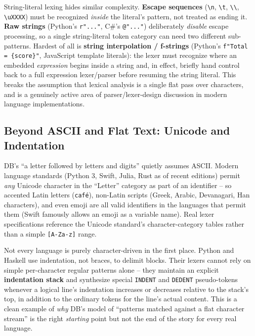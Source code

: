 \documentclass[full-course-notes.tex]{subfiles}
\begin{document}
String-literal lexing hides similar complexity. \textbf{Escape sequences}
(\texttt{\textbackslash n}, \texttt{\textbackslash t}, \texttt{\textbackslash\textbackslash},
\texttt{\textbackslash uXXXX}) must be recognized \emph{inside} the literal's pattern, not
treated as ending it. \textbf{Raw strings} (Python's \texttt{r"..."}, C\#'s \texttt{@"..."})
deliberately \emph{disable} escape processing, so a single string-literal token category can
need two different sub-patterns. Hardest of all is \textbf{string interpolation / f-strings}
(Python's \texttt{f"Total = \{score\}"}, JavaScript template literals): the lexer must recognize
where an embedded \emph{expression} begins inside a string and, in effect, briefly hand control
back to a full expression lexer/parser before resuming the string literal. This breaks the
assumption that lexical analysis is a single flat pass over characters, and is a genuinely
active area of parser/lexer-design discussion in modern language implementations.

\subsection{Beyond ASCII and Flat Text: Unicode and Indentation}

DB's ``a letter followed by letters and digits'' quietly assumes ASCII. Modern language
standards (Python 3, Swift, Julia, Rust as of recent editions) permit \emph{any} Unicode
character in the ``Letter'' category as part of an identifier -- so accented Latin letters
(\texttt{caf\'e}), non-Latin scripts (Greek, Arabic, Devanagari, Han characters), and even emoji
are all valid identifiers in the languages that permit them (Swift famously allows an emoji as a
variable name). Real lexer specifications reference the Unicode standard's character-category
tables rather than a simple \texttt{[A-Za-z]} range.

Not every language is purely character-driven in the first place. Python and Haskell use
indentation, not braces, to delimit blocks. Their lexers cannot rely on simple per-character
regular patterns alone -- they maintain an explicit \textbf{indentation stack} and synthesize
special \texttt{INDENT} and \texttt{DEDENT} pseudo-tokens whenever a logical line's indentation
increases or decreases relative to the stack's top, in addition to the ordinary tokens for the
line's actual content. This is a clean example of \emph{why} DB's model of ``patterns matched
against a flat character stream'' is the right \emph{starting} point but not the end of the
story for every real language.
\end{document}

